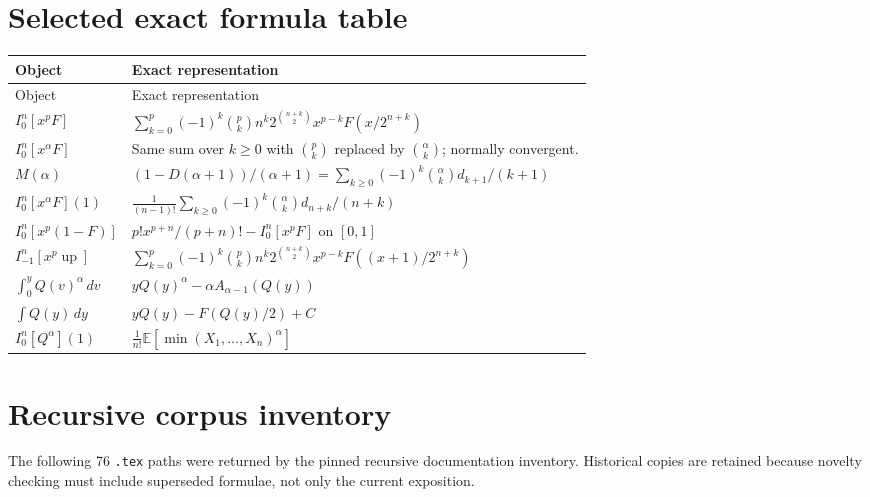 \documentclass[11pt,oneside]{article}
\numberwithin{equation}{section}
\theoremstyle{definition}
\theoremstyle{remark}
\newcommand{\E}{\mathbb E}
\newcommand{\Up}{\operatorname{up}}
\newcommand{\rise}[2]{#1^{\overline{#2}}}
\begin{document}
\section{Selected exact formula table}
\label{app:formula-table}

\begin{longtable}{@{}p{}p{}@{}}
\toprule
Object & Exact representation\\
\midrule
\endfirsthead
\toprule
Object & Exact representation\\
\midrule
\endhead
$\displaystyle I_0^n[x^pF]$
& $\displaystyle\sum_{k=0}^p(-1)^k\binom pk\rise nk
2^{\binom{n+k}{2}}x^{p-k}F(x/2^{n+k})$\\[0.7em]
$\displaystyle I_0^n[x^\alpha F]$
& Same sum over $k\ge0$ with $\binom pk$ replaced by $\binom\alpha k$; normally convergent.\\[0.7em]
$\displaystyle M(\alpha)$
& $\displaystyle(1-D(\alpha+1))/(\alpha+1)
=\sum_{k\ge0}(-1)^k\binom\alpha k d_{k+1}/(k+1)$\\[0.7em]
$\displaystyle I_0^n[x^\alpha F](1)$
& $\displaystyle\frac1{(n-1)!}\sum_{k\ge0}(-1)^k\binom\alpha k d_{n+k}/(n+k)$\\[0.7em]
$\displaystyle I_0^n[x^p(1-F)]$
& $\displaystyle p!x^{p+n}/(p+n)!-I_0^n[x^pF]$ on $[0,1]$\\[0.7em]
$\displaystyle I_{-1}^n[x^p\Up]$
& $\displaystyle\sum_{k=0}^p(-1)^k\binom pk\rise nk2^{\binom{n+k}{2}}
 x^{p-k}F((x+1)/2^{n+k})$\\[0.7em]
$\displaystyle\int_0^yQ(v)^\alpha\,dv$
& $\displaystyle yQ(y)^\alpha-\alpha A_{\alpha-1}(Q(y))$\\[0.7em]
$\displaystyle\int Q(y)\,dy$
& $\displaystyle yQ(y)-F(Q(y)/2)+C$\\[0.7em]
$\displaystyle I_0^n[Q^\alpha](1)$
& $\displaystyle\frac1{n!}\E[\min(X_1,\ldots,X_n)^\alpha]$\\[0.7em]
\bottomrule
\end{longtable}

\section{Recursive corpus inventory}
\label{app:inventory}

The following 76 \texttt{.tex} paths were returned by the pinned recursive documentation
inventory.  Historical copies are retained because novelty checking must include superseded
formulae, not only the current exposition.
\end{document}
